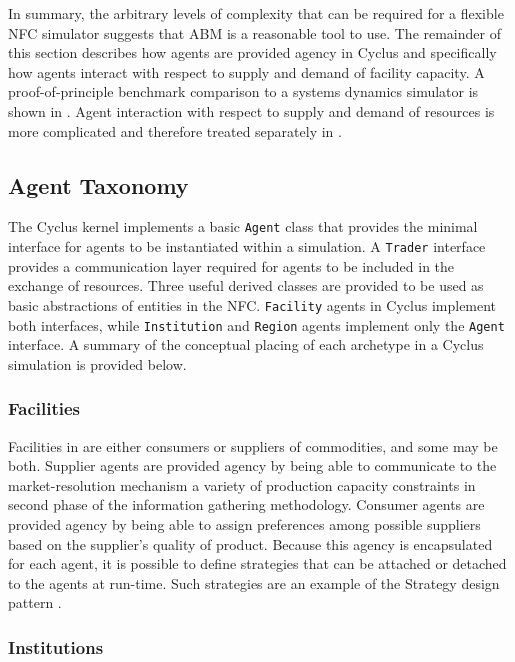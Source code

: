 In summary, the arbitrary levels of complexity that can be required for a
flexible NFC simulator suggests that ABM is a reasonable tool to use. The
remainder of this section describes how agents are provided agency in Cyclus and
specifically how agents interact with respect to supply and demand of facility
capacity. A proof-of-principle benchmark comparison to a systems dynamics
simulator is shown in . Agent interaction with respect to
supply and demand of resources is more complicated and therefore treated
separately in .

\subsection{Agent Taxonomy}\label{abm:abm:tax}

The Cyclus kernel implements a basic \texttt{Agent} class that provides the
minimal interface for agents to be instantiated within a simulation. A
\texttt{Trader} interface provides a communication layer required for agents to be
included in the exchange of resources. Three useful derived classes are provided
to be used as basic abstractions of entities in the NFC. \texttt{Facility} agents
in Cyclus implement both interfaces, while \texttt{Institution} and \texttt{Region}
agents implement only the \texttt{Agent} interface.  A summary of the conceptual
placing of each archetype in a Cyclus simulation is provided below.

\subsubsection{Facilities}

Facilities in \Cyclus are either consumers or suppliers of commodities, and some
may be both. Supplier agents are provided agency by being able to communicate to
the market-resolution mechanism a variety of production capacity constraints in
second phase of the information gathering methodology. Consumer agents are
provided agency by being able to assign preferences among possible suppliers
based on the supplier's quality of product. Because this agency is encapsulated
for each agent, it is possible to define strategies that can be attached or
detached to the agents at run-time. Such strategies are an example of the
Strategy design pattern \cite{vlissides_design_1995}.

\subsubsection{Institutions}

